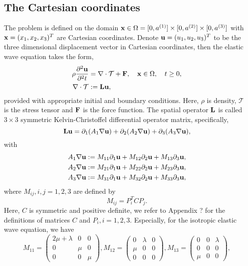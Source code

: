 \documentclass[a4paper]{article}
\begin{document}
\subsection{The Cartesian coordinates}
The problem is defined on the domain ${\bf x}\in\Omega = [0,a^{(1)}]\times[0,a^{(2)}]\times[0,a^{(3)}]$ with ${\bf x} = (x_1,x_2,x_3)^T$ are Cartesian coordinates. Denote ${\bf u} = (u_1,u_2,u_3)^T$ to be the three dimensional displacement vector in Cartesian coordinates, then the elastic wave equation takes the form,
\begin{align*}
    \rho\frac{\partial^2{\bf u}}{\partial^2 t} &= \nabla\cdot\mathcal{T} + {\bf F}, \ \ \ {\bf x}\in\Omega,\ \ \ t\geq 0,\\
    \nabla\cdot\mathcal{T} &:= {\bf Lu},
\end{align*}
provided with appropriate initial and boundary conditions. Here, $\rho$ is density, $\mathcal{T}$ is the stress tensor and ${\bf F}$ is the force function. The spatial operator ${\bf L}$ is called $3\times3$ symmetric Kelvin-Christoffel differential operator matrix, specifically,
\begin{equation*}
    {\bf L u} = \partial_1(A_1\nabla{\bf u}) + \partial_2(A_2\nabla{\bf u}) + \partial_3(A_3\nabla{\bf u}),
\end{equation*}
with
\begin{align*}
A_1\nabla{\bf u} &:= M_{11}\partial_1{\bf u} + M_{12}\partial_2{\bf u} + M_{13}\partial_3{\bf u}, \\
A_2\nabla{\bf u} &:= M_{21}\partial_1{\bf u} + M_{22}\partial_2{\bf u} + M_{23}\partial_3{\bf u}, \\
A_3\nabla{\bf u} &:= M_{31}\partial_1{\bf u} + M_{32}\partial_2{\bf u} + M_{33}\partial_3{\bf u},
\end{align*}
where $M_{ij}, i,j = 1,2,3$ are defined by
\begin{equation*}
M_{ij} = P^T_iCP_j.
\end{equation*}
Here, $C$ is symmetric and positive definite, we refer to Appendix ? for the definitions of matrices $C$ and $P_i, i = 1,2,3$. Especially, for the isotropic elastic wave equation, we have
\[ M_{11} = \left(\begin{array}{ccc}
2\mu+\lambda & 0 & 0\\
0 & \mu & 0\\
0 & 0 & \mu\end{array}\right), M_{12} = \left(\begin{array}{ccc}
0 & \lambda & 0\\
\mu & 0 & 0\\
0 & 0 & 0\end{array}\right), M_{13} = \left(\begin{array}{ccc}
0 & 0 & \lambda\\
0 & 0 & 0\\
\mu & 0 & 0\end{array}\right),\]
\end{document}
